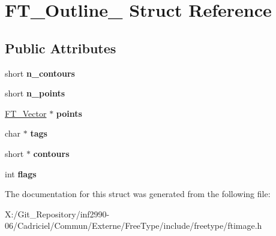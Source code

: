 \hypertarget{struct_f_t___outline__}{\section{F\-T\-\_\-\-Outline\-\_\- Struct Reference}
\label{struct_f_t___outline__}
}
\subsection*{Public Attributes}
\begin{DoxyCompactItemize}
\item 
\hypertarget{struct_f_t___outline___a0313ba9c2c51f10e6b7d7ef97bd946e2}{short {\bfseries n\-\_\-contours}}\label{struct_f_t___outline___a0313ba9c2c51f10e6b7d7ef97bd946e2}

\item 
\hypertarget{struct_f_t___outline___a7ebcf3c33231af88655534d1ac02b66e}{short {\bfseries n\-\_\-points}}\label{struct_f_t___outline___a7ebcf3c33231af88655534d1ac02b66e}

\item 
\hypertarget{struct_f_t___outline___a4871896a2f38bdab947e30a7cf6bca04}{\hyperlink{struct_f_t___vector__}{F\-T\-\_\-\-Vector} $\ast$ {\bfseries points}}\label{struct_f_t___outline___a4871896a2f38bdab947e30a7cf6bca04}

\item 
\hypertarget{struct_f_t___outline___ac84ca66907361e1f49ec11c14720087a}{char $\ast$ {\bfseries tags}}\label{struct_f_t___outline___ac84ca66907361e1f49ec11c14720087a}

\item 
\hypertarget{struct_f_t___outline___a218fdea14003061142ac1045ac50affa}{short $\ast$ {\bfseries contours}}\label{struct_f_t___outline___a218fdea14003061142ac1045ac50affa}

\item 
\hypertarget{struct_f_t___outline___a149765f0be0eab4fc82410cf853964bf}{int {\bfseries flags}}\label{struct_f_t___outline___a149765f0be0eab4fc82410cf853964bf}

\end{DoxyCompactItemize}


The documentation for this struct was generated from the following file\-:\begin{DoxyCompactItemize}
\item 
X\-:/\-Git\-\_\-\-Repository/inf2990-\/06/\-Cadriciel/\-Commun/\-Externe/\-Free\-Type/include/freetype/ftimage.\-h\end{DoxyCompactItemize}
